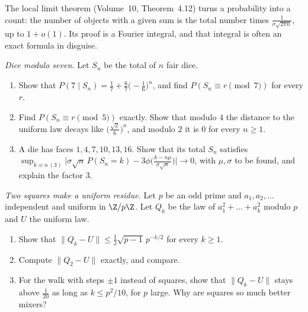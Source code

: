 The local limit theorem (Volume~10, Theorem~4.12) turns a probability into a count: the number of objects with a given sum is the total number times
$\frac{1}{\sigma\sqrt{2\pi n}}$, up to $1+o(1)$. Its proof is a Fourier integral, and that integral is often an exact formula in disguise.

\begin{exercise}[$\star$]\label{pb:dice}
\emph{Dice modulo seven.} Let $S_n$ be the total of $n$ fair dice.
\begin{enumerate}[label=(\alph*)]
\item Show that $P(7\mid S_n)=\frac17+\frac67\bigl(-\frac16\bigr)^n$, and find $P(S_n\equiv r\pmod7)$ for every $r$.
\item Find $P(S_n\equiv r\pmod5)$ exactly. Show that modulo $4$ the distance to the uniform law decays like $\bigl(\frac{\sqrt2}6\bigr)^n$, and modulo $2$ it is $0$ for
every $n\ge1$.
\item A die has faces $1,4,7,10,13,16$. Show that its total $S_n$ satisfies $\sup_{k\equiv n\,(3)}\bigl|\sigma\sqrt n\,P(S_n=k)-3\phi\bigl(\frac{k-n\mu}{\sigma\sqrt n}\bigr)\bigr|\to0$,
with $\mu,\sigma$ to be found, and explain the factor $3$.
\end{enumerate}
\end{exercise}

\begin{exercise}[$\star$]\label{pb:squaresmodp}
\emph{Two squares make a uniform residue.} Let $p$ be an odd prime and $a_1,a_2,\dots$ independent and uniform in $\Z/p\Z$. Let $Q_k$ be the law of
$a_1^2+\dots+a_k^2$ modulo $p$ and $U$ the uniform law.
\begin{enumerate}[label=(\alph*)]
\item Show that $\|Q_k-U\|\le\frac12\sqrt{p-1}\,p^{-k/2}$ for every $k\ge1$.
\item Compute $\|Q_2-U\|$ exactly, and compare.
\item For the walk with steps $\pm1$ instead of squares, show that $\|Q_k-U\|$ stays above $\frac1{20}$ as long as $k\le p^2/10$, for $p$ large. Why are squares so
much better mixers?
\end{enumerate}
\end{exercise}

